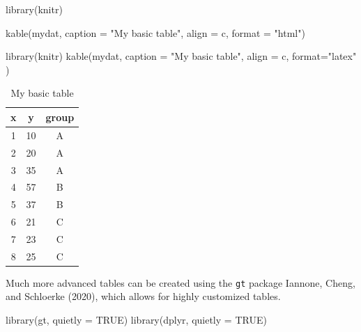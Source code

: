 \documentclass[
  letterpaper,
  DIV=11,
  numbers=noendperiod]{scrreprt}
\newenvironment{Shaded}{\begin{snugshade}}{\end{snugshade}}
\newcommand{\AttributeTok}[1]{\textcolor[rgb]{0.40,0.45,0.13}{#1}}
\newcommand{\ConstantTok}[1]{\textcolor[rgb]{0.56,0.35,0.01}{#1}}
\newcommand{\FunctionTok}[1]{\textcolor[rgb]{0.28,0.35,0.67}{#1}}
\newcommand{\NormalTok}[1]{\textcolor[rgb]{0.00,0.23,0.31}{#1}}
\newcommand{\StringTok}[1]{\textcolor[rgb]{0.13,0.47,0.30}{#1}}
\begin{document}
\begin{Shaded}
\begin{Highlighting}[]
\FunctionTok{library}\NormalTok{(knitr)}

\FunctionTok{kable}\NormalTok{(mydat,}
      \AttributeTok{caption =} \StringTok{"My basic table"}\NormalTok{,}
      \AttributeTok{align =} \StringTok{\textquotesingle{}c\textquotesingle{}}\NormalTok{,  }
      \AttributeTok{format =} \StringTok{"html"}\NormalTok{)}
\end{Highlighting}
\end{Shaded}

\begin{Shaded}
\begin{Highlighting}[]
\FunctionTok{library}\NormalTok{(knitr)}
\FunctionTok{kable}\NormalTok{(mydat,}
      \AttributeTok{caption =} \StringTok{"My basic table"}\NormalTok{,}
      \AttributeTok{align =} \StringTok{\textquotesingle{}c\textquotesingle{}}\NormalTok{,  }
      \AttributeTok{format=}\StringTok{"latex"}\NormalTok{  )}
\end{Highlighting}
\end{Shaded}

\begin{table}

\caption{My basic table}
\centering
\begin{tabular}[t]{c|c|c}
\hline
x & y & group\\
\hline
1 & 10 & A\\
\hline
2 & 20 & A\\
\hline
3 & 35 & A\\
\hline
4 & 57 & B\\
\hline
5 & 37 & B\\
\hline
6 & 21 & C\\
\hline
7 & 23 & C\\
\hline
8 & 25 & C\\
\hline
\end{tabular}
\end{table}

Much more advanced tables can be created using the \texttt{gt} package
Iannone, Cheng, and Schloerke (2020), which allows for highly customized
tables.

\begin{Shaded}
\begin{Highlighting}[]
\FunctionTok{library}\NormalTok{(gt, }
        \AttributeTok{quietly =} \ConstantTok{TRUE}\NormalTok{)}
\FunctionTok{library}\NormalTok{(dplyr,}
        \AttributeTok{quietly =} \ConstantTok{TRUE}\NormalTok{)}
\end{Highlighting}
\end{Shaded}
\end{document}
